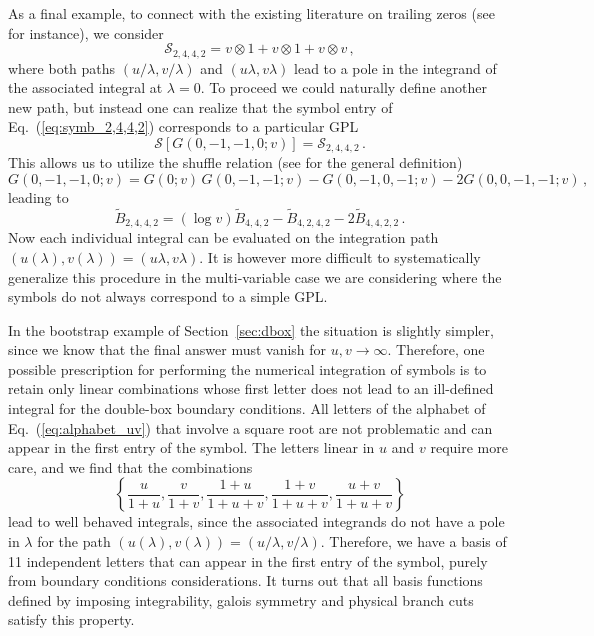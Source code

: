 \documentclass[a4paper,11pt]{article}
\begin{document}
As a final example, to connect with the existing literature on trailing zeros (see \cite{Walden:2020odh} for instance), we consider 
\begin{equation}    \label{eq:symb_2,4,4,2}
    \mathcal{S}_{2,4,4,2}= v \otimes 1+v \otimes 1+v \otimes v\,,
\end{equation}
where both paths $(u/\lambda, v/\lambda)$ and $(u \lambda, v \lambda)$ lead to a pole in the integrand of the associated integral at $\lambda =0$. To proceed we could naturally define another new path, but instead one can realize that the symbol entry of Eq.~(\ref{eq:symb_2,4,4,2}) corresponds to a particular GPL
\begin{equation}
    \mathcal{S}\left[G(0,-1,-1,0;v)\right] = \mathcal{S}_{2,4,4,2} \,.
\end{equation}
This allows us to utilize the shuffle relation (see \cite{Duhr:2011zq,Duhr:2012fh} for the general definition) 
\begin{equation}
    G(0,-1,-1,0;v)= G(0;v)\,G(0,-1,-1;v)-G(0,-1,0,-1;v)-2G(0,0,-1,-1;v) \,,
\end{equation}
leading to 
\begin{equation}
    \tilde{B}_{2,4,4,2} = (\log v) \tilde{B}_{4,4,2} - \tilde{B}_{4,2,4,2} - 2\tilde{B}_{4,4,2,2}  \,.
\end{equation}
Now each individual integral can be evaluated on the integration path $(u(\lambda), v(\lambda))=(u \lambda, v \lambda)$. It is however more difficult to systematically generalize this procedure in the multi-variable case we are considering where the symbols do not always correspond to a simple GPL. 

In the bootstrap example of Section~\ref{sec:dbox} the situation is slightly simpler, since we know that the final answer must vanish for $u,v \rightarrow \infty$. Therefore, one possible prescription for performing the numerical integration of symbols is to retain only linear combinations whose first letter does not lead to an ill-defined integral for the double-box boundary conditions. All letters of the alphabet of Eq.~(\ref{eq:alphabet_uv}) that involve a square root are not problematic and can appear in the first entry of the symbol. The letters linear in $u$ and $v$ require more care, and we find that the combinations
\begin{equation}
    \left\{\frac{u}{1+u},\frac{v}{1+v}, \frac{1+u}{1+u+v}, \frac{1+v}{1+u+v}, \frac{u+v}{1+u+v}\right\}
\end{equation}
lead to well behaved integrals, since the associated integrands do not have a pole in $\lambda$ for the path $(u(\lambda), v(\lambda))=(u/ \lambda, v/ \lambda)$. Therefore, we have a basis of 11 independent letters that can appear in the first entry of the symbol, purely from boundary conditions considerations. It turns out that all basis functions defined by imposing integrability, galois symmetry and physical branch cuts satisfy this property.





\end{document}
